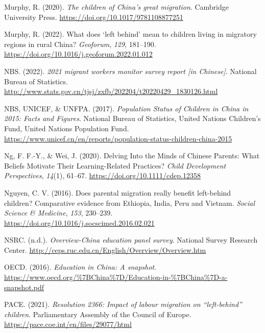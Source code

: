 \documentclass[
  man]{apa7}
\newlength{\cslhangindent}
\newlength{\cslentryspacingunit} %
\newenvironment{CSLReferences}[2] %
 {%
  \setlength{\parindent}{0pt}
  \ifodd #1
  \let\oldpar\par
  \def\par{\hangindent=\cslhangindent\oldpar}
  \fi
  \setlength{\parskip}{#2\cslentryspacingunit}
 }%
 {}
\begin{document}
\begin{CSLReferences}{1}{0}
\leavevmode{}%
Murphy, R. (2020). \emph{The children of {China}{'}s great migration}. Cambridge University Press. \url{https://doi.org/10.1017/9781108877251}

\leavevmode{}%
Murphy, R. (2022). What does {`}left behind{'} mean to children living in migratory regions in rural {China}? \emph{Geoforum}, \emph{129}, 181--190. \url{https://doi.org/10.1016/j.geoforum.2022.01.012}

\leavevmode{}%
NBS. (2022). \emph{2021 migrant workers monitor survey report {[}in {Chinese}{]}}. National Bureau of Statistics. \url{http://www.stats.gov.cn/tjsj/zxfb/202204/t20220429_1830126.html}

\leavevmode{}%
NBS, UNICEF, \& UNFPA. (2017). \emph{Population Status of Children in {China} in 2015: Facts and Figures}. National Bureau of Statistics, United Nations Children's Fund, United Nations Population Fund. \url{https://www.unicef.cn/en/reports/population-status-children-china-2015}

\leavevmode{}%
Ng, F. F.-Y., \& Wei, J. (2020). Delving Into the Minds of Chinese Parents: What Beliefs Motivate Their Learning-Related Practices? \emph{Child Development Perspectives}, \emph{14}(1), 61--67. \url{https://doi.org/10.1111/cdep.12358}

\leavevmode{}%
Nguyen, C. V. (2016). Does parental migration really benefit left-behind children? Comparative evidence from Ethiopia, India, Peru and Vietnam. \emph{Social Science \& Medicine}, \emph{153}, 230--239. \url{https://doi.org/10.1016/j.socscimed.2016.02.021}

\leavevmode{}%
NSRC. (n.d.). \emph{Overview-{China} education panel survey}. National Survey Research Center. \url{http://ceps.ruc.edu.cn/English/Overview/Overview.htm}

\leavevmode{}%
OECD. (2016). \emph{Education in {China}: A snapshot}. \url{https://www.oecd.org/\%7BChina\%7D/Education-in-\%7BChina\%7D-a-snapshot.pdf}

\leavevmode{}%
PACE. (2021). \emph{Resolution 2366: Impact of labour migration on {``}left-behind{''} children}. Parliamentary Assembly of the Council of Europe. \url{https://pace.coe.int/en/files/29077/html}


\end{CSLReferences}
\end{document}
